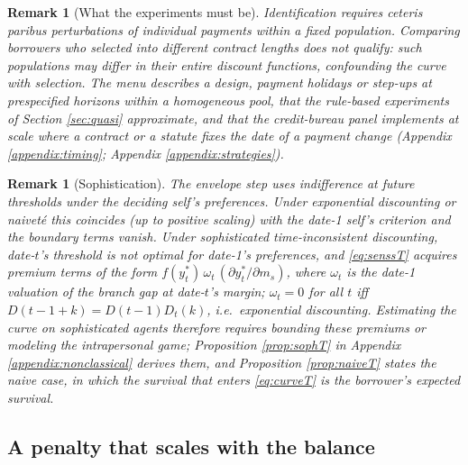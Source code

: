 \documentclass[12pt,english]{article}
\newtheorem{remark}[theorem]{Remark}
\begin{document}
\begin{remark}[What the experiments must be]\label{rem:experimentsT}
Identification requires ceteris paribus perturbations of individual payments within a fixed population. Comparing borrowers who selected into different contract lengths does not qualify: such populations may differ in their entire discount functions, confounding the curve with selection. The menu describes a design, payment holidays or step-ups at prespecified horizons within a homogeneous pool, that the rule-based experiments of Section \ref{sec:quasi} approximate, and that the credit-bureau panel implements at scale where a contract or a statute fixes the date of a payment change (Appendix \ref{appendix:timing}; Appendix \ref{appendix:strategies}).
\end{remark}

\begin{remark}[Sophistication]\label{rem:sophT}
The envelope step uses indifference at future thresholds under the \emph{deciding self's} preferences. Under exponential discounting or naivet\'e this coincides (up to positive scaling) with the date-1 self's criterion and the boundary terms vanish. Under sophisticated time-inconsistent discounting, date-$t$'s threshold is not optimal for date-1's preferences, and \eqref{eq:senssT} acquires premium terms of the form $f(y_t^*)\,\omega_t\,(\partial y_t^*/\partial m_s)$, where $\omega_t$ is the date-1 valuation of the branch gap at date-$t$'s margin; $\omega_t = 0$ for all $t$ iff $D(t-1+k) = D(t-1)D_t(k)$, i.e.\ exponential discounting. Estimating the curve on sophisticated agents therefore requires bounding these premiums or modeling the intrapersonal game; Proposition \ref{prop:sophT} in Appendix \ref{appendix:nonclassical} derives them, and Proposition \ref{prop:naiveT} states the naive case, in which the survival that enters \eqref{eq:curveT} is the borrower's expected survival.
\end{remark}

\subsection{A penalty that scales with the balance}\label{appendix:balancepenalty}
\end{document}
